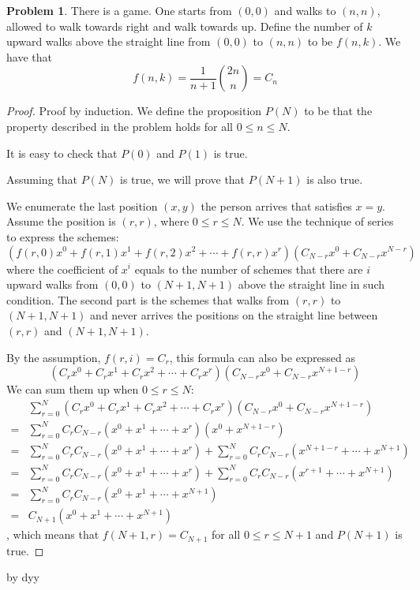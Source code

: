 \documentclass[12pt]{article}
\theoremstyle{definition}
\newtheorem{hw}{Problem}
\begin{document}
	
	\bigskip
	
	\begin{hw}
		There is a game. One starts from $(0,0)$ and walks to $(n,n)$, allowed to walk towards right and walk towards up. Define the number of $k$ upward walks above the straight line from $(0,0)$ to $(n,n)$ to be $f(n,k)$. We have that 
		$$
			f(n,k) = \frac{1}{n+1}\binom{2n}{n} = C_n
		$$
	\end{hw}
	
	\begin{proof}
		Proof by induction. We define the proposition $P(N)$ to be that the property described in the problem holds for all $0 \leq n \leq N$. 
		
		It is easy to check that $P(0)$ and $P(1)$ is true. 
		
		Assuming that $P(N)$ is true, we will prove that $P(N+1)$ is also true.
		
		We enumerate the last position $(x,y)$ the person arrives that satisfies $x = y$. Assume the position is $(r,r)$, where $0 \leq r \leq N$. We use the technique of series to express the schemes:
		$$
			(f(r,0)x^0+f(r,1)x^1+f(r,2)x^2+\cdots +f(r,r)x^r)(C_{N-r}x^0 + C_{N-r}x^{N-r})
		$$
		where the coefficient of $x^i$ equals to the number of schemes that there are $i$ upward walks from $(0,0)$ to $(N+1,N+1)$ above the straight line in such condition. The second part is the schemes that walks from $(r,r)$ to $(N+1,N+1)$ and never arrives the positions on the straight line between $(r,r)$ and $(N+1,N+1)$. 
		
		By the assumption, $f(r,i) = C_r$, this formula can also be expressed as
		$$
			(C_rx^0+C_rx^1+C_rx^2+\cdots +C_rx^r)(C_{N-r}x^0 + C_{N-r}x^{N+1-r})
		$$
		We can sum them up when $0 \leq r \leq N$:
		\[
		\begin{split}
		 & \sum_{r = 0}^{N}(C_rx^0+C_rx^1+C_rx^2+\cdots +C_rx^r)(C_{N-r}x^0 + C_{N-r}x^{N+1-r}) \\ 
		=& \sum_{r = 0}^{N}C_rC_{N-r}(x^0+x^1+\cdots+x^r)(x^0+x^{N+1-r}) \\
		=& \sum_{r = 0}^{N}C_rC_{N-r}(x^0+x^1+\cdots+x^r) + \sum_{r = 0}^{N}C_rC_{N-r}(x^{N+1-r}+\cdots+x^{N+1}) \\
		=& \sum_{r = 0}^{N}C_rC_{N-r}(x^0+x^1+\cdots+x^r) + \sum_{r = 0}^{N}C_rC_{N-r}(x^{r+1}+\cdots+x^{N+1}) \\
		=& \sum_{r = 0}^{N}C_rC_{N-r}(x^0+x^1+\cdots+x^{N+1}) \\
		=& C_{N+1}(x^0+x^1+\cdots+x^{N+1})
		\end{split}
		\],
		which means that $f(N+1,r) = C_{N+1}$ for all $0 \leq r \leq N+1$ and $P(N+1)$ is true.
	\end{proof}
	
	\hfill by dyy
\end{document}

